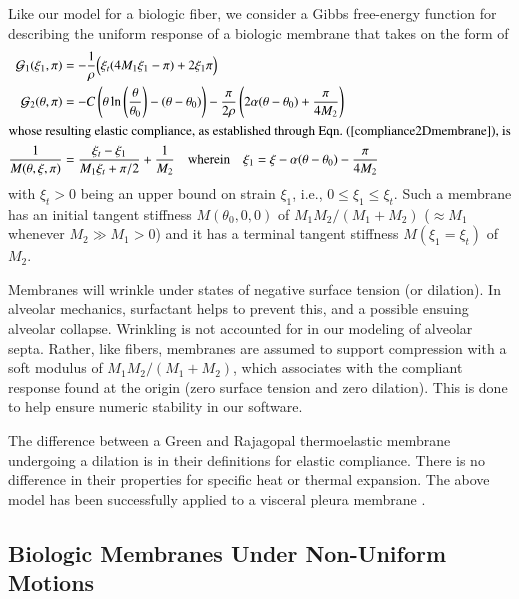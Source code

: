 Like our model for a biologic fiber, we consider a Gibbs free-energy function for describing the uniform response of a biologic membrane that takes on the form of
\begin{subequations} 
    \label{uniformMembrane}
    \begin{align}
    \mathcal{G}_1 (\xi_1 , \pi) & = - \frac{1}{\rho} 
    \Bigl( \xi_t (4M_1 \xi_1 - \pi ) + 2 \xi_1 \pi \Bigr) \\
    \mathcal{G}_2 (\theta , \pi) & = -C \left( \theta \ln \left( \frac{\theta}{\theta_0} \right) -
    (\theta - \theta_0) \right) - \frac{\pi}{2\rho} \left( 
    2 \alpha ( \theta - \theta_0 ) + \frac{\pi}{4M_2} \right) \\
    \intertext{whose resulting elastic compliance, as established through Eqn.~(\ref{compliance2Dmembrane}), is}
    \frac{1}{M(\theta, \xi, \pi)} & = 
    \frac{\xi_t - \xi_1}{M_1 \xi_t + \pi / 2} + \frac{1}{M_2} 
    \quad \text{wherein} \quad 
    \xi_1 = \xi - \alpha (\theta - \theta_0) - \frac{\pi}{4M_2}
    \label{membraneCompliance}
    \end{align}
\end{subequations}
with $\xi_t > 0$ being an upper bound on strain $\xi_1$, i.e., $0 \leq \xi_1 \leq \xi_t$.  Such a membrane has an initial tangent stiffness $M(\theta_0, 0, 0)$ of $M_1 M_2 / ( M_1 + M_2 )$ ($\approx M_1$ whenever $M_2 \gg M_1 > 0$) and it has a terminal tangent stiffness $M(\xi_1 \! = \! \xi_t)$ of $M_2$.

Membranes will wrinkle under states of negative surface tension (or dilation).  In alveolar mechanics, surfactant helps to prevent this, and a possible ensuing alveolar collapse.  Wrinkling is not accounted for in our modeling of alveolar septa.  Rather, like fibers, membranes are assumed to support compression with a soft modulus of $M_1 M_2 / ( M_1 + M_2 )$, which associates with the compliant response found at the origin (zero surface tension and zero dilation).  This is done to help ensure numeric stability in our software.

The difference between a Green and Rajagopal thermo\-elastic membrane under\-going a dilation is in their definitions for elastic compliance.  There is no difference in their properties for specific heat or thermal expansion.  The above model has been successfully applied to a visceral pleura membrane \cite{Freedetal17}.

\subsection{Biologic Membranes Under Non-Uniform Motions}

